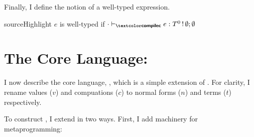 Finally, I define the notion of a well-typed \sourceLang{} expression. 
\begin{definition}{sourceHighlight}
  $e$ is well-typed if $\ctypejudge[\cdot]{e}{T^0 \, ! \, \emptyset;\emptyset}$
\end{definition}

\section{The Core Language: \texorpdfstring{\coreLang{}}{Lambda-Op-AST}}\label{section:core-lang}
I now describe the core language, \coreLang{}, which is a simple extension of \efflang{}. For clarity, I rename \efflang{} values ($v$) and compuations ($c$) to \coreLang{} normal forms ($n$) and terms ($t$) respectively.  

To construct \coreLang{}, I extend \efflang{} in two ways. First, I add machinery for metaprogramming:

